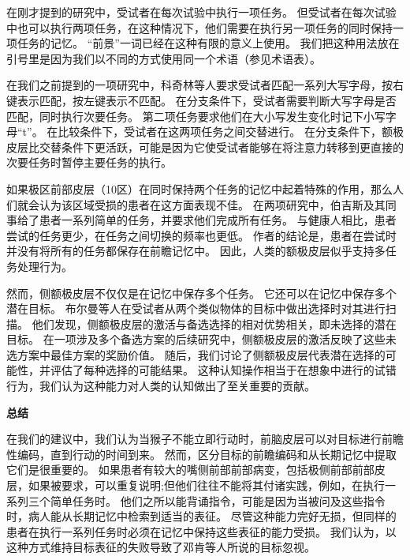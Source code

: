 在刚才提到的研究中，受试者在每次试验中执行一项任务。
但受试者在每次试验中也可以执行两项任务，在这种情况下，他们需要在执行另一项任务的同时保持一项任务的记忆。
“前景”一词已经在这种有限的意义上使用\cite{burgess2000cognitive}。
我们把这种用法放在引号里是因为我们以不同的方式使用同一个术语（参见术语表）。
\par


在我们之前提到的一项研究中，科奇林等人\cite{koechlin1999role}要求受试者匹配一系列大写字母，按右键表示匹配，按左键表示不匹配。
在分支条件下，受试者需要判断大写字母是否匹配，同时执行次要任务。
第二项任务要求他们在大小写发生变化时记下小写字母“t”。
在比较条件下，受试者在这两项任务之间交替进行。
在分支条件下，额极皮层比交替条件下更活跃，可能是因为它使受试者能够在将注意力转移到更直接的次要任务时暂停主要任务的执行。
\par


如果极区前部皮层（10区）在同时保持两个任务的记忆中起着特殊的作用，那么人们就会认为该区域受损的患者在这方面表现不佳。
在两项研究中，伯吉斯及其同事给了患者一系列简单的任务，并要求他们完成所有任务\cite{burgess2000cognitive,burgess2007function}。
与健康人相比，患者尝试的任务更少，在任务之间切换的频率也更低。
作者的结论是，患者在尝试时并没有将所有的任务都保存在前瞻记忆中。
因此，人类的额极皮层似乎支持多任务处理行为。
\par


然而，侧额极皮层不仅仅是在记忆中保存多个任务。
它还可以在记忆中保存多个潜在目标。
布尔曼等人\cite{boorman2009green}在受试者从两个类似物体的目标中做出选择时对其进行扫描。
他们发现，侧额极皮层的激活与备选选择的相对优势相关，即未选择的潜在目标。
在一项涉及多个备选方案的后续研究中，侧额极皮层的激活反映了这些未选方案中最佳方案的奖励价值\cite{boorman2011counterfactual}。
随后，我们讨论了侧额极皮层代表潜在选择的可能性，并评估了每种选择的可能结果。
这种认知操作相当于在想象中进行的试错行为，我们认为这种能力对人类的认知做出了至关重要的贡献。
\par



\textbf{总结}
\par
在我们的建议中，我们认为当猴子不能立即行动时，前脑皮层可以对目标进行前瞻性编码，直到行动的时间到来。
然而，区分目标的前瞻编码和从长期记忆中提取它们是很重要的。
如果患者有较大的嘴侧前部前部病变，包括极侧前部前部皮层，如果被要求，可以重复说明;但他们往往不能将其付诸实践，例如，在执行一系列三个简单任务时\cite{burgess2000cognitive}。
他们之所以能背诵指令，可能是因为当被问及这些指令时，病人能从长期记忆中检索到适当的表征。
尽管这种能力完好无损，但同样的患者在执行一系列任务时必须在记忆中保持这些表征的能力受损。
我们认为，以这种方式维持目标表征的失败导致了邓肯等人\cite{duncan2008goal}所说的目标忽视。



